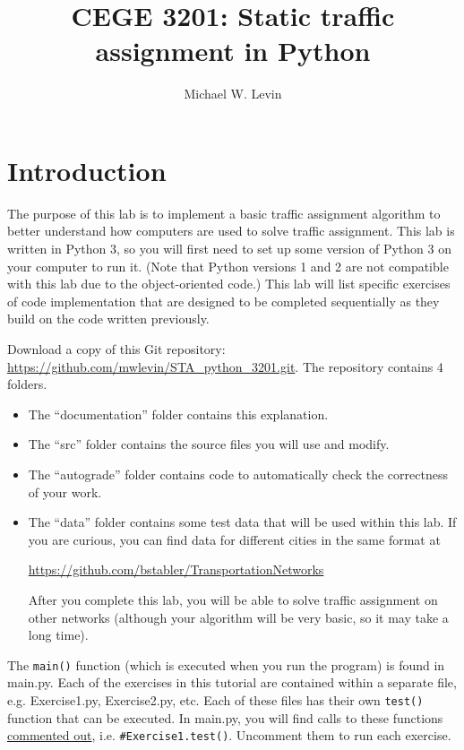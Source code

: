 \documentclass[11pt]{article}
\begin{document}
	\allowdisplaybreaks[1]
	
	
	\title{CEGE 3201: Static traffic assignment in Python}
	
	\author{Michael W. Levin}
	
	
	
	\maketitle
	
	
	\section{Introduction}
	
	The purpose of this lab is to implement a basic traffic assignment algorithm to better understand how computers are used to solve traffic assignment. This lab is written in Python 3, so you will first need to set up some version of Python 3 on your computer to run it. (Note that Python versions 1 and 2 are not compatible with this lab due to the object-oriented code.) This lab will list specific exercises of code implementation that are designed to be completed sequentially as they build on the code written previously. 
	
	
	Download a copy of this Git repository: \href{https://github.com/mwlevin/STA_python_3201.git}{https://github.com/mwlevin/STA\_python\_3201.git}. 
	The repository contains 4 folders.
	\begin{itemize}
		\item The ``documentation'' folder contains this explanation.
		\item The ``src'' folder contains the source files you will use and modify.
		\item The ``autograde'' folder contains code to automatically check the correctness of your work.
		\item The ``data'' folder contains some test data that will be used within this lab. If you are curious, you can find data for different cities in the same format at
		
		\noindent \href{https://github.com/bstabler/TransportationNetworks}{https://github.com/bstabler/TransportationNetworks}
		
		\noindent
		After you complete this lab, you will be able to solve traffic assignment on other networks (although your algorithm will be very basic, so it may take a long time).
	\end{itemize}
	
	The \texttt{main()} function (which is executed when you run the program) is found in main.py. Each of the exercises in this tutorial are contained within a separate file, e.g. Exercise1.py, Exercise2.py, etc. Each of these files has their own \texttt{test()} function that can be executed.
	In main.py, you will find calls to these functions \href{https://www.w3schools.com/python/python_comments.asp}{commented out}, i.e. \texttt{\#Exercise1.test()}. Uncomment them to run each exercise. 
	
\end{document}
